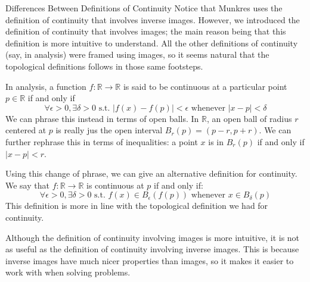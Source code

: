 \begin{remarkBox}{Differences Between Definitions of Continuity}
    Notice that Munkres uses the definition of continuity that involves 
    inverse images.
    However, we introduced the definition of continuity that involves 
    images; the main reason being that this definition is more intuitive to
    understand.
    All the other definitions of continuity (say, in analysis) were framed 
    using images, so it seems natural that the topological definitions
    follows in those same footsteps.

    \baseSkip
    
    In analysis, a function \( f: \mathbb{R} \rightarrow \mathbb{R} \) is 
    said to be continuous at a particular point \( p \in \mathbb{R} \) if and
    only if 
    \begin{equation*}
        \forall \epsilon > 0, \exists \delta > 0 \text{ s.t. }
        \lvert f ( x ) - f ( p ) \rvert < \epsilon
        \text{ whenever } \lvert x - p \rvert < \delta
    \end{equation*}
    We can phrase this instead in terms of open balls. In \( \mathbb{R} \), an
    open ball of radius \( r \) centered at \( p \) is really jus the open 
    interval \( B_{ r }( p ) = ( p - r, p + r ) \).
    We can further rephrase this in terms of inequalities: a point \( x \)
    is in \( B_{ r }( p ) \) if and only if \( \lvert x - p \rvert < r \).

    \baseSkip 
    
    Using this change of phrase, we can give an alternative definition for
    continuity. We say that \( f: \mathbb{R} \rightarrow \mathbb{R} \) is
    continuous at \( p \) if and only if:
    \begin{equation*}
        \forall \epsilon > 0, \exists \delta > 0 \text{ s.t. }
        f ( x ) \in B_{ \epsilon }( f ( p ) ) 
        \text{ whenever } x \in B_{ \delta }( p )
    \end{equation*}
    This definition is more in line with the topological definition we had 
    for continuity.
    
    \baseSkip

    Although the definition of continuity involving images is more intuitive,
    it is not as useful as the definition of continuity involving inverse 
    images.
    This is because inverse images have much nicer properties than images, so
    it makes it easier to work with when solving problems.
\end{remarkBox}

